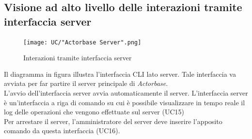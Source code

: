 \documentclass[a4paper]{article}
\begin{document}
		 
		 
		 
		 
		 
		 
		 
		 
		 
		 
		 
		 
		 
		 
		 
		 
		 
		 
		 
		 
		 
		 
		 
		 
		 \subsection{Visione ad alto livello delle interazioni tramite interfaccia server}
		 	\begin{figure}[H]
				\centering
				\texttt{[image: UC/"Actorbase Server".png]}
				\caption{Interazioni tramite interfaccia server}
			\end{figure}
			Il diagramma in figura illustra l'interfaccia CLI lato server. Tale interfaccia va avviata per far partire il server principale di \emph{Actorbase}.
			\\ 
			L'avvio dell'interfaccia server avvia automaticamente il server. L'interfaccia server è un'interfaccia a riga di comando su cui è possibile visualizzare in tempo reale il log delle operazioni che vengono effettuate sul server (UC15)
			\\ 
			Per arrestare il server, l'amministratore del server deve inserire l'apposito comando da questa interfaccia (UC16).
			
\end{document}
